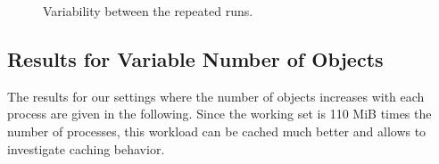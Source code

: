 \documentclass[a4paper,10pt]{article}
\begin{document}
\begin{figure}
\centering
{}
\caption{Variability between the repeated runs. \label{fig:variability}}
\end{figure}





\subsection{Results for Variable Number of Objects}

The results for our settings where the number of objects increases with each process are given in the following.
Since the working set is 110 MiB times the number of processes, this workload can be cached much better and allows to investigate caching behavior.
\end{document}

